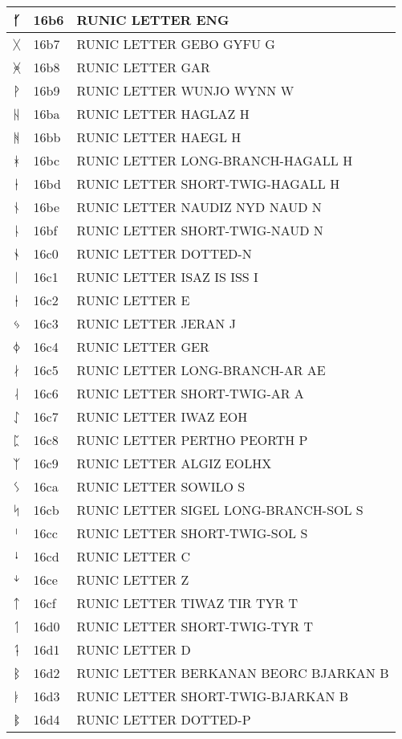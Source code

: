 \documentclass[12pt,letterpaper,openany]{book}
\begin{document}
\begin{center}
\begin{supertabular}{|m{0.25in}|m{0.5in}|m{4in}|}
ᚶ & 16b6 & RUNIC LETTER ENG\\\hline
ᚷ & 16b7 & RUNIC LETTER GEBO GYFU G\\\hline
ᚸ & 16b8 & RUNIC LETTER GAR\\\hline
ᚹ & 16b9 & RUNIC LETTER WUNJO WYNN W\\\hline
ᚺ & 16ba & RUNIC LETTER HAGLAZ H\\\hline
ᚻ & 16bb & RUNIC LETTER HAEGL H\\\hline
ᚼ & 16bc & RUNIC LETTER LONG-BRANCH-HAGALL H\\\hline
ᚽ & 16bd & RUNIC LETTER SHORT-TWIG-HAGALL H\\\hline
ᚾ & 16be & RUNIC LETTER NAUDIZ NYD NAUD N\\\hline
ᚿ & 16bf & RUNIC LETTER SHORT-TWIG-NAUD N\\\hline
ᛀ & 16c0 & RUNIC LETTER DOTTED-N\\\hline
ᛁ & 16c1 & RUNIC LETTER ISAZ IS ISS I\\\hline
ᛂ & 16c2 & RUNIC LETTER E\\\hline
ᛃ & 16c3 & RUNIC LETTER JERAN J\\\hline
ᛄ & 16c4 & RUNIC LETTER GER\\\hline
ᛅ & 16c5 & RUNIC LETTER LONG-BRANCH-AR AE\\\hline
ᛆ & 16c6 & RUNIC LETTER SHORT-TWIG-AR A\\\hline
ᛇ & 16c7 & RUNIC LETTER IWAZ EOH\\\hline
ᛈ & 16c8 & RUNIC LETTER PERTHO PEORTH P\\\hline
ᛉ & 16c9 & RUNIC LETTER ALGIZ EOLHX\\\hline
ᛊ & 16ca & RUNIC LETTER SOWILO S\\\hline
ᛋ & 16cb & RUNIC LETTER SIGEL LONG-BRANCH-SOL S\\\hline
ᛌ & 16cc & RUNIC LETTER SHORT-TWIG-SOL S\\\hline
ᛍ & 16cd & RUNIC LETTER C\\\hline
ᛎ & 16ce & RUNIC LETTER Z\\\hline
ᛏ & 16cf & RUNIC LETTER TIWAZ TIR TYR T\\\hline
ᛐ & 16d0 & RUNIC LETTER SHORT-TWIG-TYR T\\\hline
ᛑ & 16d1 & RUNIC LETTER D\\\hline
ᛒ & 16d2 & RUNIC LETTER BERKANAN BEORC BJARKAN B\\\hline
ᛓ & 16d3 & RUNIC LETTER SHORT-TWIG-BJARKAN B\\\hline
ᛔ & 16d4 & RUNIC LETTER DOTTED-P\\\hline

\end{supertabular}
\end{center}
\end{document}
